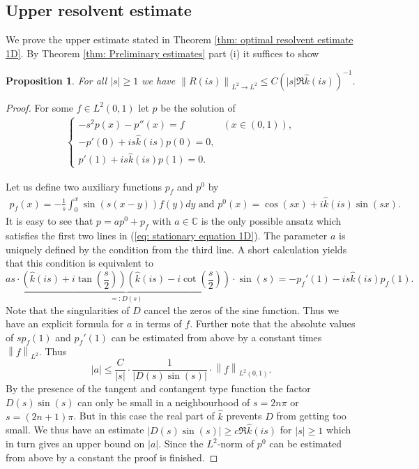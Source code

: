 \documentclass{amsart}
\newcommand{\abs}[1]{\left|#1\right|}
\newcommand{\norm}[1]{\left\| #1 \right\|}
\newcommand{\khat}{\hat{k}}
\newcommand{\C}{\mathbb{C}}
\newtheorem{Proposition}[Theorem]{Proposition}
\begin{document}
\subsection{Upper resolvent estimate}\label{sec: Upper resolvent estimate}
We prove the upper estimate stated in Theorem \ref{thm: optimal resolvent estimate 1D}. By Theorem \ref{thm: Preliminary estimates} part (i) it suffices to show
\begin{Proposition}
 For all $\abs{s}\geq 1$ we have $\norm{R(is)}_{L^2\rightarrow L^2}\leq C(\abs{s}\Re\khat(is))^{-1}$.
\end{Proposition}
\begin{proof}
 For some $f\in L^2(0,1)$ let $p$ be the solution of
  \begin{align}\label{eq: stationary equation 1D}
  \begin{cases}
   -s^2p(x) - p''(x) = f & (x\in(0,1)), \\
   -p'(0) + is\khat(is)p(0) = 0, &  \\
   p'(1) + is\khat(is)p(1) = 0. & 
  \end{cases}
 \end{align}

Let us define two auxiliary functions $p_f$ and $p^0$ by
\begin{align*}
 p_f(x) = -\frac{1}{s}\int_0^x \sin(s(x-y))f(y) dy \text{ and } p^0(x) = \cos(sx) + i\khat(is)\sin(sx).
\end{align*}
It is easy to see that $p=ap^0+p_f$ with $a\in\C$ is the only possible ansatz which satisfies the first two lines in (\ref{eq: stationary equation 1D}). The parameter $a$ is uniquely defined by the condition from the third line. A short calculation yields that this condition is equivalent to
\begin{equation}\nonumber
 a s\cdot \underbrace{\left( \khat(is) + i\tan\left(\frac{s}{2}\right) \right) \left( \khat(is) - i\cot\left(\frac{s}{2}\right) \right)}_{=:D(s)}\cdot \sin(s)
 = - p_f'(1) - is\khat(is) p_f(1).
\end{equation}
Note that the singularities of $D$ cancel the zeros of the sine function. Thus we have an explicit formula for $a$ in terms of $f$. Further note that the absolute values of $sp_f(1)$ and $p_f'(1)$ can be estimated from above by a constant times $\norm{f}_{L^2}$. Thus 
\begin{equation}\nonumber
 \abs{a} \leq \frac{C}{\abs{s}} \cdot \frac{1}{\abs{D(s)\sin(s)}}\cdot \norm{f}_{L^2(0,1)}.
\end{equation}
By the presence of the tangent and contangent type function the factor $D(s)\sin(s)$ can only be small in a neighbourhood of $s=2n\pi$ or $s=(2n+1)\pi$. But in this case the real part of $\khat$ prevents $D$ from getting too small. We thus have an estimate $\abs{D(s)\sin(s)}\geq c \Re\khat(is)$ for $\abs{s}\geq 1$ which in turn gives an upper bound on $\abs{a}$. Since the $L^2$-norm of $p^0$ can be estimated from above by a constant the proof is finished.
\end{proof}
\end{document}
